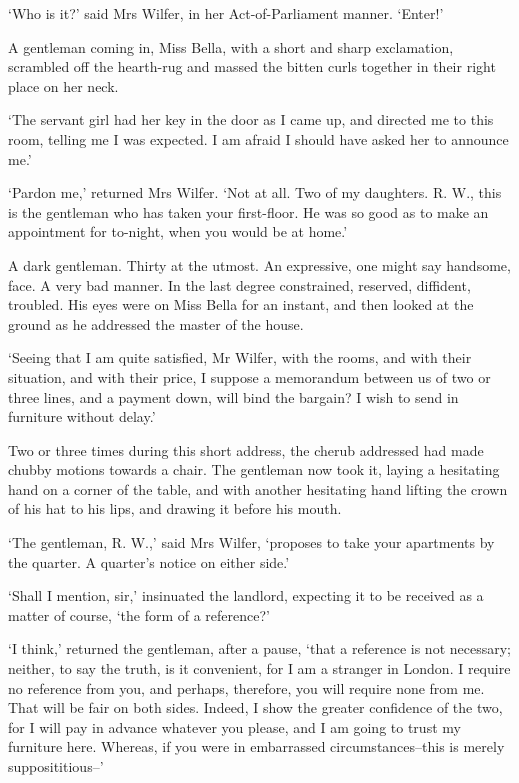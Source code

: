 ‘Who is it?’ said Mrs Wilfer, in her Act-of-Parliament manner. ‘Enter!’

A gentleman coming in, Miss Bella, with a short and sharp exclamation,
scrambled off the hearth-rug and massed the bitten curls together in
their right place on her neck.

‘The servant girl had her key in the door as I came up, and directed me
to this room, telling me I was expected. I am afraid I should have asked
her to announce me.’

‘Pardon me,’ returned Mrs Wilfer. ‘Not at all. Two of my daughters. R.
W., this is the gentleman who has taken your first-floor. He was so good
as to make an appointment for to-night, when you would be at home.’

A dark gentleman. Thirty at the utmost. An expressive, one might say
handsome, face. A very bad manner. In the last degree constrained,
reserved, diffident, troubled. His eyes were on Miss Bella for an
instant, and then looked at the ground as he addressed the master of the
house.

‘Seeing that I am quite satisfied, Mr Wilfer, with the rooms, and with
their situation, and with their price, I suppose a memorandum between us
of two or three lines, and a payment down, will bind the bargain? I wish
to send in furniture without delay.’

Two or three times during this short address, the cherub addressed had
made chubby motions towards a chair. The gentleman now took it, laying
a hesitating hand on a corner of the table, and with another hesitating
hand lifting the crown of his hat to his lips, and drawing it before his
mouth.

‘The gentleman, R. W.,’ said Mrs Wilfer, ‘proposes to take your
apartments by the quarter. A quarter’s notice on either side.’

‘Shall I mention, sir,’ insinuated the landlord, expecting it to be
received as a matter of course, ‘the form of a reference?’

‘I think,’ returned the gentleman, after a pause, ‘that a reference is
not necessary; neither, to say the truth, is it convenient, for I am
a stranger in London. I require no reference from you, and perhaps,
therefore, you will require none from me. That will be fair on both
sides. Indeed, I show the greater confidence of the two, for I will pay
in advance whatever you please, and I am going to trust my furniture
here. Whereas, if you were in embarrassed circumstances--this is merely
supposititious--’


